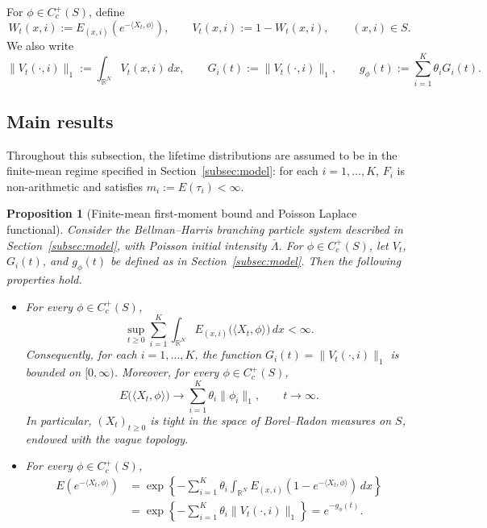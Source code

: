 \documentclass[reqno,final,11pt]{amsart}
\newcommand{\1}{\mathbbm{1}}
\theoremstyle{plain}
\newtheorem{proposition}[theorem]{Proposition}
\theoremstyle{definition}
\theoremstyle{remark}
\begin{document}
For \(\phi\in C_c^+(S)\), define
\[
W_t(x,i):=E_{(x,i)}\left(e^{-\langle X_t,\phi\rangle}\right),
\qquad
V_t(x,i):=1-W_t(x,i),
\qquad (x,i)\in S.
\]
We also write
\[
\|V_t(\cdot,i)\|_1:=\int_{\mathbb R^N}V_t(x,i)\,dx,
\qquad
G_i(t):=\|V_t(\cdot,i)\|_1,
\qquad
g_\phi(t):=\sum_{i=1}^K\theta_iG_i(t).
\]


\medskip






\subsection{Main results}\label{subsec:main-results}



Throughout this subsection, the lifetime distributions are assumed to be in the finite-mean
regime specified in Section~\ref{subsec:model}: for each $i=1,...,K$, $F_i$ is non-arithmetic and satisfies
$m_i:=E(\tau_i)<\infty$.




\begin{proposition}[Finite-mean first-moment bound and Poisson Laplace functional]
\label{Lema2.6.1}
Consider the Bellman--Harris branching particle system described in
Section~\ref{subsec:model}, with Poisson initial intensity \(\bar\Lambda\). For
\(\phi\in C_c^+(S)\), let \(V_t\), \(G_i(t)\), and \(g_\phi(t)\) be defined as in
Section~\ref{subsec:model}. Then the following properties hold.

\begin{itemize}
\item[\textup{(a)}]  For every \(\phi\in C_c^+(S)\),
 \[
 \sup_{t\ge0}
 \sum_{i=1}^K
 \int_{\mathbb R^N}
 E_{(x,i)}\big(\langle X_t,\phi\rangle\big)\,dx
 <\infty.
 \]
 Consequently, for each \(i=1,\ldots,K\), the function
 \(G_i(t)=\|V_t(\cdot,i)\|_1\) is bounded on \([0,\infty)\). Moreover, for every
 \(\phi\in C_c^+(S)\),
 \begin{equation}\label{elimit}
 E\big(\langle X_t,\phi\rangle\big)
 \longrightarrow
 \sum_{i=1}^K\theta_i\|\phi_i\|_1,
 \qquad t\to\infty .
 \end{equation}
In particular, \((X_t)_{t\ge0}\) is tight in the space of Borel--Radon measures on
\(S\), endowed with the vague topology.

\item[\textup{(b)}]
For every \(\phi\in C_c^+(S)\),
\begin{equation}\label{laplace}
\begin{split}
E\left(e^{-\langle X_t,\phi\rangle}\right)
&=
\exp\left\{
-\sum_{i=1}^K\theta_i
\int_{\mathbb R^N}
E_{(x,i)}
\left(
1-e^{-\langle X_t,\phi\rangle}
\right)\,dx
\right\}
\\
&=
\exp\left\{
-\sum_{i=1}^K\theta_i\|V_t(\cdot,i)\|_1
\right\}
=
e^{-g_\phi(t)}.
\end{split}
\end{equation}
\end{itemize}
\end{proposition}
\end{document}
